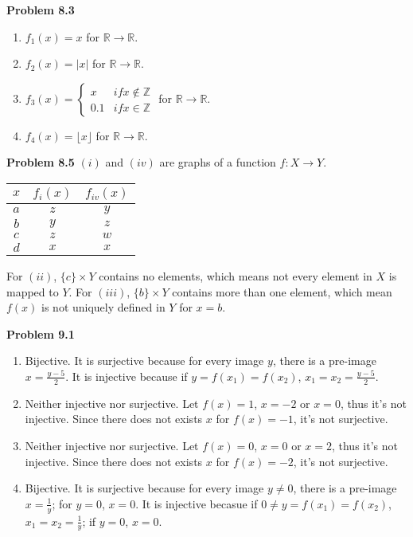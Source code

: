 \documentclass{article}
\begin{document}
\textbf{Problem 8.3}
\begin{enumerate}[label={(\roman*)}]
    \item $f_1(x)=x$ for $\mathbb{R}\rightarrow\mathbb{R}$.
    \item $f_2(x)=|x|$  for $\mathbb{R}\rightarrow\mathbb{R}$.
    \item $f_3(x)=\begin{cases}
        x & if x\not\in\mathbb{Z} \\
        0.1 & if x\in\mathbb{Z}
    \end{cases}$ for $\mathbb{R}\rightarrow\mathbb{R}$.
    \item $f_4(x)=\lfloor x\rfloor$ for $\mathbb{R}\rightarrow\mathbb{R}$.
\end{enumerate}
\bigbreak

\textbf{Problem 8.5}
$(i)$ and $(iv)$ are graphs of a function $f:X\rightarrow Y$.
\begin{center}
    \begin{tabular}{ |c|c c| } 
     \hline
     $x$ & $f_i(x)$ & $f_{iv}(x)$  \\ 
     \hline
     $a$ & $z$ & $y$ \\ 
     $b$ & $y$ & $z$ \\ 
     $c$ & $z$ & $w$ \\ 
     $d$ & $x$ & $x$ \\ 
     \hline
    \end{tabular}
\end{center}

For $(ii)$, $\{c\}\times Y$ contains no elements, which means not every element in $X$ is mapped to $Y$. 
For $(iii)$, $\{b\}\times Y$ contains more than one element, which mean $f(x)$ is not uniquely defined in $Y$ for $x=b$.
\bigbreak

\textbf{Problem 9.1}
\begin{enumerate}[label={(\roman*)}]
    \item Bijective. It is surjective because for every image $y$, there is a pre-image $x=\frac{y-5}{2}$. It is injective because if $y=f(x_1)=f(x_2)$, $x_1=x_2=\frac{y-5}{2}$.
    \item Neither injective nor surjective. Let $f(x)=1$, $x=-2$ or $x=0$, thus it's not injective. Since there does not exists $x$ for $f(x)=-1$, it's not surjective.
    \item Neither injective nor surjective. Let $f(x)=0$, $x=0$ or $x=2$, thus it's not injective. Since there does not exists $x$ for $f(x)=-2$, it's not surjective.
    \item Bijective. It is surjective because for every image $y\neq 0$, there is a pre-image $x=\frac{1}{y}$; for $y=0$, $x=0$. It is injective becasue if $0\neq y =f(x_1)=f(x_2)$, $x_1=x_2=\frac{1}{y}$; if $y=0$, $x=0$.
\end{enumerate}
\bigbreak
\end{document}
